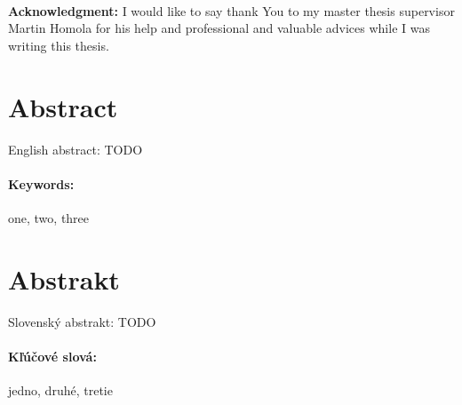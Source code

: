 \documentclass[12pt, oneside]{book}
\begin{document}
\frontmatter

\setcounter{page}{3}
\newpage 

\begin{minipage}{0.25\textwidth}~\end{minipage}
\begin{minipage}{0.68\textwidth}
{\bf Acknowledgment:} I would like to say thank You to my master thesis supervisor Martin Homola for his help and professional and valuable advices while I was writing this thesis.\bigskip\bigskip

\end{minipage}
\newpage


\newpage 
\section*{Abstract}

English abstract: TODO


\paragraph*{Keywords:} one, two, three


\newpage 
\section*{Abstrakt}


Slovenský abstrakt: TODO

\paragraph*{Kľúčové slová:} jedno, druhé, tretie

%
%
\end{document}
